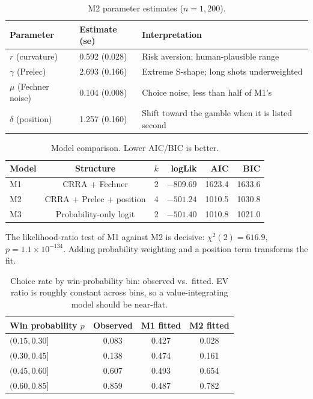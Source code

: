 \documentclass[11pt]{article}
\begin{document}
\begin{table}[h]
\centering
\caption{M2 parameter estimates ($n = 1{,}200$).}
\label{tab:params}
\begin{tabular}{@{}lll@{}}
\toprule
Parameter & Estimate (se) & Interpretation \\
\midrule
$r$ (curvature)            & 0.592 (0.028) & Risk aversion; human-plausible range \\
$\gamma$ (Prelec)          & 2.693 (0.166) & Extreme S-shape; long shots underweighted \\
$\mu$ (Fechner noise)      & 0.104 (0.008) & Choice noise, less than half of M1's \\
$\delta$ (position)        & 1.257 (0.160) & Shift toward the gamble when it is listed second \\
\bottomrule
\end{tabular}
\end{table}

\begin{table}[h]
\centering
\caption{Model comparison. Lower AIC/BIC is better.}
\label{tab:compare}
\begin{tabular}{@{}lccrrr@{}}
\toprule
Model & Structure & $k$ & logLik & AIC & BIC \\
\midrule
M1 & CRRA + Fechner            & 2 & $-809.69$ & 1623.4 & 1633.6 \\
M2 & CRRA + Prelec + position  & 4 & $-501.24$ & 1010.5 & 1030.8 \\
M3 & Probability-only logit    & 2 & $-501.40$ & 1010.8 & 1021.0 \\
\bottomrule
\end{tabular}
\end{table}

The likelihood-ratio test of M1 against M2 is decisive: $\chi^2(2) = 616.9$, $p = 1.1 \times
10^{-134}$. Adding probability weighting and a position term transforms the fit.

\begin{table}[h]
\centering
\caption{Choice rate by win-probability bin: observed vs.\ fitted. EV ratio is roughly constant across
bins, so a value-integrating model should be near-flat.}
\label{tab:bins}
\begin{tabular}{@{}lccc@{}}
\toprule
Win probability $p$ & Observed & M1 fitted & M2 fitted \\
\midrule
$(0.15, 0.30]$ & 0.083 & 0.427 & 0.028 \\
$(0.30, 0.45]$ & 0.138 & 0.474 & 0.161 \\
$(0.45, 0.60]$ & 0.607 & 0.493 & 0.654 \\
$(0.60, 0.85]$ & 0.859 & 0.487 & 0.782 \\
\bottomrule
\end{tabular}
\end{table}
\end{document}
